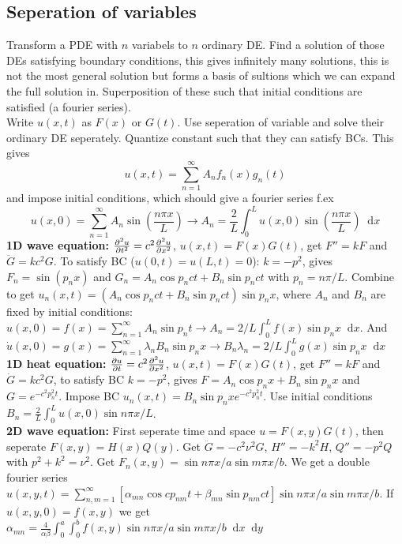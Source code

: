 \documentclass[a4paper, 10pt]{article}
\newcommand*\diff{\mathop{}\!\mathrm{d}}
\begin{document}
\begin{multicols*}{3}
\subsection*{Seperation of variables}
Transform a PDE with $n$ variabels to $n$ ordinary DE. Find a solution of those DEs satisfying boundary conditions, this gives infinitely many solutions, this is not the most general solution but forms a basis of sultions which we can expand the full solution in. Superposition of these such that initial conditions are satisfied (a fourier series).\\
Write $u(x,t)$ as $F(x)$ or $G(t)$. Use seperation of variable and solve their ordinary DE seperately. Quantize constant such that they can satisfy BCs. This gives
$$ u(x,t) = \sum_{n=1}^{\infty} A_n f_n(x)g_n(t)$$
and impose initial conditions, which should give a fourier series f.ex
$$ u(x,0) = \sum_{n=1}^\infty A_n \sin{\left( \frac{n\pi x}{L} \right)} \rightarrow A_n = \frac{2}{L}\int_0^L u(x,0) \sin{\left( \frac{n\pi x}{L} \right)} \diff x$$
\textbf{1D wave equation:} $\pdv[2]{u}{t} = c^2\pdv[2]{u}{x}$, $u(x,t) = F(x)G(t)$, get $F'' = kF$ and $\ddot{G} = kc^2G$. To satisfy BC ($u(0,t) = u(L,t)=0$): $k=-p^2$, gives $F_n = \sin{\left(p_nx\right)}$ and $G_n = A_n \cos{p_nc t} + B_n\sin{p_nc t}$ with $p_n=n\pi/L$.
Combine to get $u_n(x,t) = \left(A_n \cos{p_nc t} + B_n\sin{p_nc t}\right)\sin{p_nx}$, where $A_n$ and $B_n$ are fixed by initial conditions: $u(x,0) = f(x) = \sum_{n=1}^{\infty}A_n \sin{p_n t} \rightarrow A_n = 2/L \int_0^Lf(x)\sin{p_nx}\diff x$. And $\dot{u}(x,0)=g(x)=\sum_{n=1}^{\infty}\lambda_nB_n\sin{p_nx} \rightarrow B_n\lambda_n = 2/L \int_0^L g(x)\sin{p_nx}\diff x$ \\
\textbf{1D heat equation:} $\pdv{u}{t} = c^2\pdv[2]{u}{x}$, $u(x,t) = F(x)G(t)$, get $F'' = kF$ and $\dot{G} = kc^2G$, to satisfy BC $k=-p^2$, gives $F=A_n\cos{p_nx}+B_n\sin{p_nx}$ and $G = e^{-c^2p_n^2t}$. Impose BC $u_n(x,t) = B_n\sin{p_nx}e^{-c^2p_n^2t}$. Use initial conditions $B_n=\frac{2}{L}\int_0^Lu(x,0)\sin{n\pi x/L}$.\\
\textbf{2D wave equation:} First seperate time and space $u = F(x,y)G(t)$, then seperate $F(x,y) = H(x)Q(y)$. Get $\ddot{G}=-c^2\nu^2G$, $H'' = -k^2H$, $Q'' = -p^2Q$ with $p^2+k^2 = \nu^2$. Get $F_{n}(x,y) = \sin{n\pi x/a}\sin{m\pi x/b}$. We get a double fourier series
$u(x,y,t) = \sum_{n,m=1}^{\infty}[\alpha_{mn}\cos{cp_{nm}t} + \beta_{mn}\sin{p_{nm}ct}]\sin{n\pi x/a}\sin{m\pi x/b}$. If $u(x,y,0) = f(x,y)$ we get
$\alpha_{mn} = \frac{4}{\alpha\beta}\int_0^a\int_0^b f(x,y)\sin{n\pi x/a}\sin{m\pi x/b} \diff x \diff y$


\end{multicols*}
\end{document}
